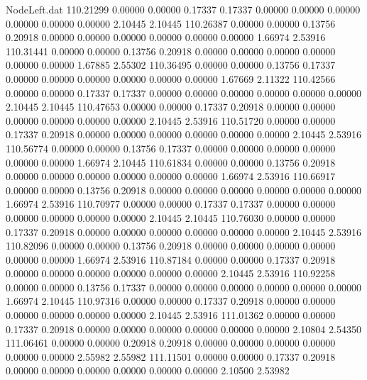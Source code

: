 \begin{filecontents}{NodeLeft.dat}
 110.21299    0.00000    0.00000     0.17337    0.17337    0.00000    0.00000    0.00000    0.00000    0.00000    0.00000    2.10445    2.10445
 110.26387    0.00000    0.00000     0.13756    0.20918    0.00000    0.00000    0.00000    0.00000    0.00000    0.00000    1.66974    2.53916
 110.31441    0.00000    0.00000     0.13756    0.20918    0.00000    0.00000    0.00000    0.00000    0.00000    0.00000    1.67885    2.55302
 110.36495    0.00000    0.00000     0.13756    0.17337    0.00000    0.00000    0.00000    0.00000    0.00000    0.00000    1.67669    2.11322
 110.42566    0.00000    0.00000     0.17337    0.17337    0.00000    0.00000    0.00000    0.00000    0.00000    0.00000    2.10445    2.10445
 110.47653    0.00000    0.00000     0.17337    0.20918    0.00000    0.00000    0.00000    0.00000    0.00000    0.00000    2.10445    2.53916
 110.51720    0.00000    0.00000     0.17337    0.20918    0.00000    0.00000    0.00000    0.00000    0.00000    0.00000    2.10445    2.53916
 110.56774    0.00000    0.00000     0.13756    0.17337    0.00000    0.00000    0.00000    0.00000    0.00000    0.00000    1.66974    2.10445
 110.61834    0.00000    0.00000     0.13756    0.20918    0.00000    0.00000    0.00000    0.00000    0.00000    0.00000    1.66974    2.53916
 110.66917    0.00000    0.00000     0.13756    0.20918    0.00000    0.00000    0.00000    0.00000    0.00000    0.00000    1.66974    2.53916
 110.70977    0.00000    0.00000     0.17337    0.17337    0.00000    0.00000    0.00000    0.00000    0.00000    0.00000    2.10445    2.10445
 110.76030    0.00000    0.00000     0.17337    0.20918    0.00000    0.00000    0.00000    0.00000    0.00000    0.00000    2.10445    2.53916
 110.82096    0.00000    0.00000     0.13756    0.20918    0.00000    0.00000    0.00000    0.00000    0.00000    0.00000    1.66974    2.53916
 110.87184    0.00000    0.00000     0.17337    0.20918    0.00000    0.00000    0.00000    0.00000    0.00000    0.00000    2.10445    2.53916
 110.92258    0.00000    0.00000     0.13756    0.17337    0.00000    0.00000    0.00000    0.00000    0.00000    0.00000    1.66974    2.10445
 110.97316    0.00000    0.00000     0.17337    0.20918    0.00000    0.00000    0.00000    0.00000    0.00000    0.00000    2.10445    2.53916
 111.01362    0.00000    0.00000     0.17337    0.20918    0.00000    0.00000    0.00000    0.00000    0.00000    0.00000    2.10804    2.54350
 111.06461    0.00000    0.00000     0.20918    0.20918    0.00000    0.00000    0.00000    0.00000    0.00000    0.00000    2.55982    2.55982
 111.11501    0.00000    0.00000     0.17337    0.20918    0.00000    0.00000    0.00000    0.00000    0.00000    0.00000    2.10500    2.53982

\end{filecontents}
